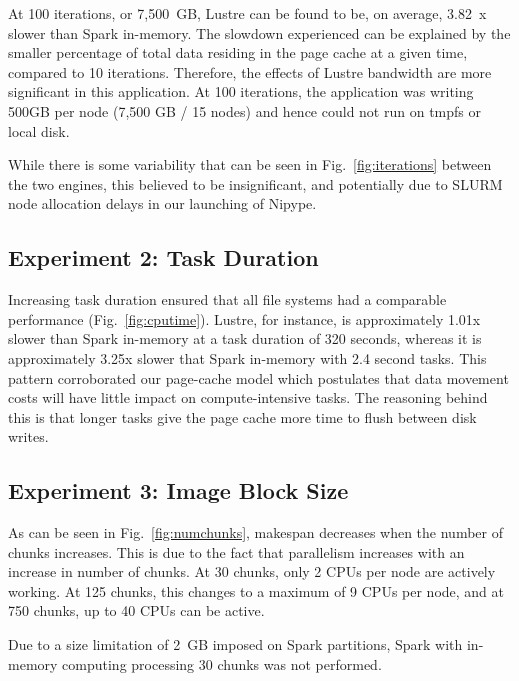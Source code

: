 \documentclass{IEEEtran}
\begin{document}
At 100 iterations, or 7,500~GB, Lustre can be found to be, on average, 3.82~x 
slower than Spark in-memory. The 
slowdown experienced can be explained by the smaller percentage of total data 
residing in the page cache at a given time, compared to 10 iterations. 
Therefore, the effects of Lustre bandwidth are more significant in 
this application. At 100 iterations, the application was writing 500GB 
per node (7,500 GB / 15 nodes) and hence could not run on tmpfs or local disk.

While there is some variability that can be seen in Fig.~\ref{fig:iterations} 
between the two engines, this believed to be insignificant, and potentially due 
to SLURM node allocation delays in our launching of Nipype.


\subsection{Experiment 2: Task Duration}
%

Increasing task duration ensured that all file systems had a comparable performance
(Fig.~\ref{fig:cputime}). Lustre, for instance, is approximately 1.01x slower
than Spark in-memory at a task duration of 320 seconds, whereas it is 
approximately 3.25x slower that Spark in-memory with 2.4 second tasks. This 
pattern corroborated our page-cache model which postulates that 
data movement costs will have little impact on compute-intensive tasks. The 
reasoning behind this is that longer tasks give the page cache more time to flush 
between disk writes.

\subsection{Experiment 3: Image Block Size}

As can be seen in Fig.~\ref{fig:numchunks}, makespan decreases when the 
number of chunks increases. This is due to the fact that parallelism 
increases with an increase in number of chunks. At 30 chunks, 
only 2 CPUs per node are actively working. At 125 chunks, this changes 
to a maximum of 9 CPUs per node, and at 750 chunks, up to 40 CPUs can be 
active.

Due to a size limitation of 2~GB imposed on Spark partitions, Spark with in-memory
computing processing 30 chunks was not performed.
\end{document}
